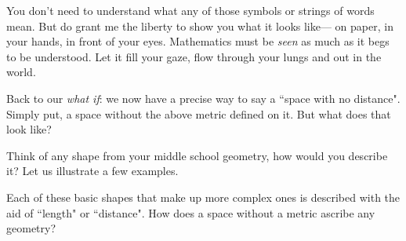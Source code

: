\documentclass[11pt, letterpaper]{article}
\begin{document}
You don't need to understand what any of those symbols or strings of words mean. But do grant me the liberty to show you what it looks like--- on paper, in your hands, in front of your eyes. Mathematics must be \textit{seen} as much as it begs to be understood. Let it fill your gaze, flow through your lungs and out in the world.

Back to our \textit{what if}: we now have a precise way to say a ``space with no distance". Simply put, a space without the above metric defined on it. But what does that look like?

Think of any shape from your middle school geometry, how would you describe it? Let us illustrate a few examples.

\begin{mathbox}
\begin{center}
\end{center}
\end{mathbox}

Each of these basic shapes that make up more complex ones is described with the aid of ``length" or ``distance". How does a space without a metric ascribe any geometry?
\end{document}
